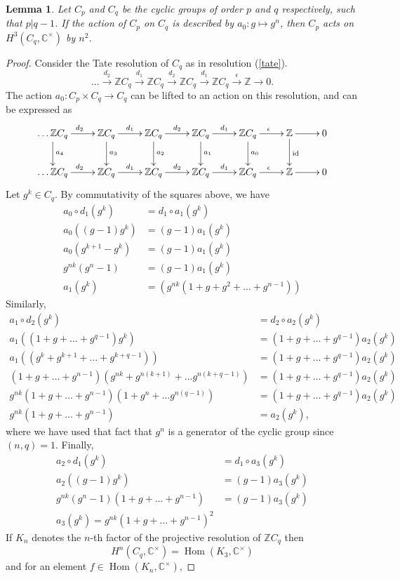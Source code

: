 \documentclass[a4paper, 10pt]{book}
\newtheorem{Lem}[theorem]{Lemma}
\theoremstyle{definition}
\numberwithin{equation}{chapter}
\newcommand\id{\operatorname{id}}
\newcommand\Hom{\operatorname{Hom}}
\newcommand\CC{\mathbb C}
\newcommand\ZZ{\mathbb Z}
\newcommand{\ra}\rightarrow
\newcommand{\xra}\xrightarrow
\begin{document}
\begin{appendices}
\begin{Lem}
Let $C_p$ and $C_q$ be the cyclic groups of order $p$ and $q$ respectively, such that $p|q-1$. If the action of $C_p$ on $C_q$ is described by $a_0: g\mapsto g^n$, then $C_p$ acts on $H^3(C_q, \CC^\times)$ by $n^2$.
\end{Lem}
\begin{proof}
Consider the Tate resolution of $C_q$ as in resolution (\ref{tate}).
\[
	\dots \xra{d_2}\ZZ C_q\xra{d_1} \ZZ C_q \xra{d_2} \ZZ C_q\xra{d_1} \ZZ C_q\xra{\epsilon}\ZZ\ra 0.
\]
The action $a_0: C_p \times C_q\ra C_q$ can be lifted to an action on this resolution, and can be expressed as
	\[ \xymatrix{\dots\ZZ C_q \ar[r]^{d_2} \ar[d]^{a_4}&\ZZ C_q\ar[r]^{d_1}\ar[d]^{a_3} & \ZZ C_q \ar[r]^{d_2}\ar[d]^{a_2} & \ZZ C_q\ar[r]^{d_1}\ar[d]^{a_1} & \ZZ C_q\ar[r]^{\epsilon}\ar[d]^{a_0}& \ZZ\ar[d]^{\id}\ar[r] & 0\\
\dots\ZZ C_q \ar[r]^{d_2} &\ZZ C_q\ar[r]^{d_1} & \ZZ C_q \ar[r]^{d_2} & \ZZ C_q\ar[r]^{d_1} & \ZZ C_q\ar[r]^{\epsilon}& \ZZ \ar[r]& 0}
\]
Let $g^k\in C_q$. By commutativity of the squares above, we have \begin{align*}
	a_0\circ d_1(g^k) &= d_1\circ a_1 (g^k)\\
	a_0((g-1)g^k) &= (g-1) a_1(g^{k})\\
	a_0 (g^{k+1} - g^k) &= (g-1) a_1(g^{k})\\
	g^{nk}(g^n - 1) &= (g-1) a_1(g^{k})\\
	a_1(g^{k}) &= (g^{nk}(1 + g + g^2 +\dots + g^{n-1}))
\end{align*}
Similarly,  \begin{align*}
	a_1\circ d_2(g^k) &= d_2\circ a_2 (g^k)\\
	a_1((1+ g + \dots + g^{q-1})g^k) &= (1+ g + \dots + g^{q-1}) a_2(g^k)\\
	a_1((g^k+ g^{k+1} + \dots + g^{k+q-1}))  &= (1+ g + \dots + g^{q-1}) a_2(g^k)\\
 (1+g + \dots +g^{n-1})(g^{nk} + g^{n(k+1)} +\dots g^{n(k+q-1)}) &= (1+ g + \dots + g^{q-1}) a_2(g^k)\\
 g^{nk}(1+g + \dots +g^{n-1})(1 + g^n +\dots g^{n(q-1)}) &= (1+ g + \dots + g^{q-1}) a_2(g^k)\\
	g^{nk}(1+g + \dots +g^{n-1}) &=  a_2(g^k),
\end{align*} where we have used that fact that $g^n$ is a generator of the cyclic group since $(n, q) = 1$.
Finally,
\begin{align*}
	a_2\circ d_1(g^k) &= d_1\circ a_3 (g^k)\\
	a_2((g-1)g^k) &= (g-1) a_3(g^{k})\\
g^{nk}(g^n-1)(1+g + \dots +g^{n-1}) &= (g-1) a_3(g^{k})\\
a_3(g^k) = g^{nk}(1+g + \dots +g^{n-1})^2
	\end{align*}
If $K_n$ denotes the $n$-th factor of the projective resolution of $\ZZ C_q$ then \begin{equation*}
	H^n(C_q, \CC^\times) = \Hom(K_3, \CC^\times)
\end{equation*}and for an element $f \in \Hom(K_n, \CC^\times)$,


\end{proof}
\end{appendices}
\end{document}
